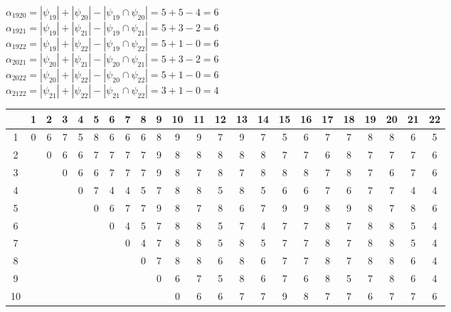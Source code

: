 \documentclass[a4paper,12pt]{article}
\begin{document}
$\alpha_{1920} = |\psi_{19}| + |\psi_{20}| - |\psi_{19} \cap \psi_{20}| = 5 + 5 - 4 = 6$\\
$\alpha_{1921} = |\psi_{19}| + |\psi_{21}| - |\psi_{19} \cap \psi_{21}| = 5 + 3 - 2 = 6$\\
$\alpha_{1922} = |\psi_{19}| + |\psi_{22}| - |\psi_{19} \cap \psi_{22}| = 5 + 1 - 0 = 6$\\
$\alpha_{2021} = |\psi_{20}| + |\psi_{21}| - |\psi_{20} \cap \psi_{21}| = 5 + 3 - 2 = 6$\\
$\alpha_{2022} = |\psi_{20}| + |\psi_{22}| - |\psi_{20} \cap \psi_{22}| = 5 + 1 - 0 = 6$\\
$\alpha_{2122} = |\psi_{21}| + |\psi_{22}| - |\psi_{21} \cap \psi_{22}| = 3 + 1 - 0 = 4$\\

\begin{table}[H]
    \centering
    \begin{tabular}{|c|c|c|c|c|c|c|c|c|c|c|c|c|c|c|c|c|c|c|c|c|c|c|}
    \hline
        ~ & 1 & 2 & 3 & 4 & 5 & 6 & 7 & 8 & 9 & 10 & 11 & 12 & 13 & 14 & 15 & 16 & 17 & 18 & 19 & 20 & 21 & 22 \\ \hline
        1 & 0 & 6 & 7 & 5 & 8 & 6 & 6 & 6 & 8 & 9 & 9 & 7 & 9 & 7 & 5 & 6 & 7 & 7 & 8 & 8 & 6 & 5 \\ \hline
        2 & ~ & 0 & 6 & 6 & 7 & 7 & 7 & 7 & 9 & 8 & 8 & 8 & 8 & 8 & 7 & 7 & 6 & 8 & 7 & 7 & 7 & 6 \\ \hline
        3 & ~ & ~ & 0 & 6 & 6 & 7 & 7 & 7 & 9 & 8 & 7 & 8 & 7 & 8 & 8 & 8 & 7 & 8 & 7 & 6 & 7 & 6 \\ \hline
        4 & ~ & ~ & ~ & 0 & 7 & 4 & 4 & 5 & 7 & 8 & 8 & 5 & 8 & 5 & 6 & 6 & 7 & 6 & 7 & 7 & 4 & 4 \\ \hline
        5 & ~ & ~ & ~ & ~ & 0 & 6 & 7 & 7 & 9 & 8 & 7 & 8 & 6 & 7 & 9 & 9 & 8 & 9 & 8 & 7 & 8 & 6 \\ \hline
        6 & ~ & ~ & ~ & ~ & ~ & 0 & 4 & 5 & 7 & 8 & 8 & 5 & 7 & 4 & 7 & 7 & 8 & 7 & 8 & 8 & 5 & 4 \\ \hline
        7 & ~ & ~ & ~ & ~ & ~ & ~ & 0 & 4 & 7 & 8 & 8 & 5 & 8 & 5 & 7 & 7 & 8 & 7 & 8 & 8 & 5 & 4 \\ \hline
        8 & ~ & ~ & ~ & ~ & ~ & ~ & ~ & 0 & 7 & 8 & 8 & 6 & 8 & 6 & 7 & 7 & 8 & 7 & 8 & 8 & 6 & 4 \\ \hline
        9 & ~ & ~ & ~ & ~ & ~ & ~ & ~ & ~ & 0 & 6 & 7 & 5 & 8 & 6 & 7 & 6 & 8 & 5 & 7 & 8 & 6 & 4 \\ \hline
        10 & ~ & ~ & ~ & ~ & ~ & ~ & ~ & ~ & ~ & 0 & 6 & 6 & 7 & 7 & 9 & 8 & 7 & 7 & 6 & 7 & 7 & 6 \\ \hline

\end{tabular}
\end{table}
\end{document}
